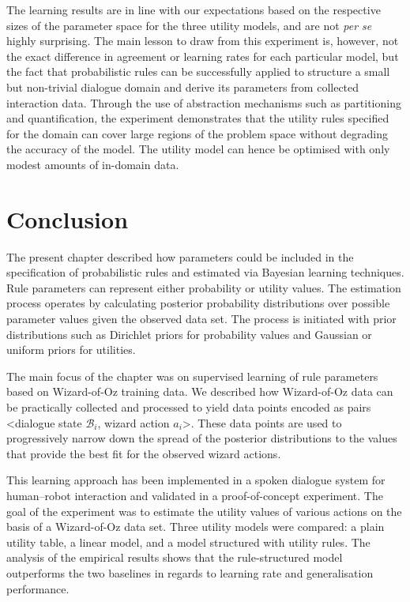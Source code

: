The learning results are in line with our expectations based on the respective sizes of the parameter space for the three utility models, and are not \textit{per se} highly surprising.  The main lesson to draw from this experiment is, however, not the exact difference in agreement or learning rates for each particular model, but the fact that probabilistic rules can be successfully applied to structure a small but non-trivial dialogue domain and derive its parameters from collected interaction data.  Through the use of abstraction mechanisms such as partitioning and quantification, the experiment demonstrates that the utility rules specified for the domain can cover large regions of the problem space without degrading the accuracy of the model.  The utility model can hence be optimised with only modest amounts of in-domain data. 


\section{Conclusion}
\label{sec:woz-conclusions}

The present chapter described how parameters could be included in the specification of probabilistic rules and estimated via Bayesian learning techniques.  Rule parameters can represent either probability or utility values. The estimation process operates by calculating posterior probability distributions over possible parameter values given the observed data set. The process is initiated with prior distributions such as Dirichlet priors for probability values and Gaussian or uniform priors for utilities. 

The main focus of the chapter was on supervised learning of rule parameters based on Wizard-of-Oz training data. We described how Wizard-of-Oz data can be practically collected and processed to yield data points encoded as pairs <dialogue state $\mathcal{B}_i$, wizard action $a_i$>.  
These data points are used to progressively narrow down the spread of the posterior distributions to the values that provide the best fit for the observed wizard actions. 

This learning approach has been implemented in a spoken dialogue system for human--robot interaction and validated in a proof-of-concept experiment.  The goal of the experiment was to estimate the utility values of various actions on the basis of a Wizard-of-Oz data set.  Three utility models were compared: a plain utility table, a linear model, and a model structured with utility rules. The analysis of the empirical results shows that the rule-structured model outperforms the two baselines in regards to learning rate and generalisation performance. 

